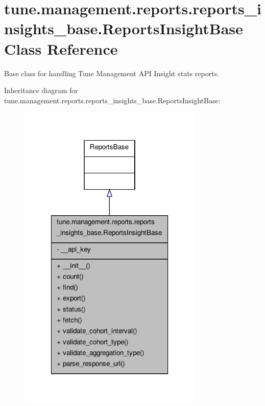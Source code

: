 \hypertarget{classtune_1_1management_1_1reports_1_1reports__insights__base_1_1ReportsInsightBase}{\section{tune.\-management.\-reports.\-reports\-\_\-insights\-\_\-base.\-Reports\-Insight\-Base Class Reference}
\label{classtune_1_1management_1_1reports_1_1reports__insights__base_1_1ReportsInsightBase}
}


Base class for handling Tune Management A\-P\-I Insight stats reports.  




Inheritance diagram for tune.\-management.\-reports.\-reports\-\_\-insights\-\_\-base.\-Reports\-Insight\-Base\-:
\nopagebreak
\begin{figure}[H]
\begin{center}
\leavevmode
\includegraphics[width=250pt]{classtune_1_1management_1_1reports_1_1reports__insights__base_1_1ReportsInsightBase__inherit__graph}
\end{center}
\end{figure}


